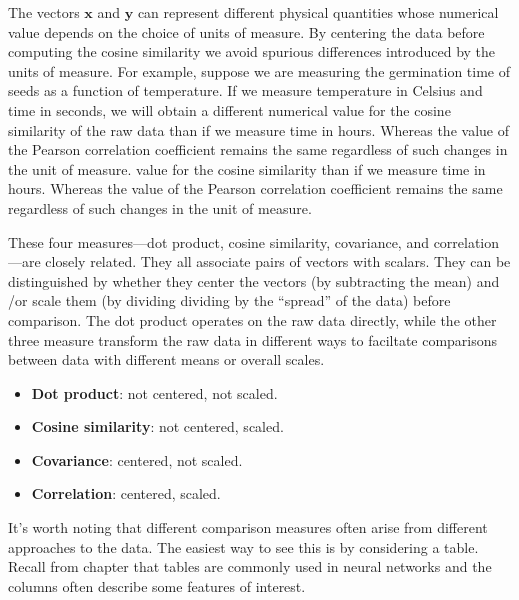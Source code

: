    The vectors $\mathbf{x}$ and $\mathbf{y}$ can represent different physical 
quantities whose numerical value depends on the choice of units of measure.
By centering the data before computing the cosine similarity we avoid spurious 
differences introduced by the units of measure.  For example, suppose we are 
measuring the germination time of seeds as a function of temperature.  If we 
measure temperature in Celsius and time in seconds, we will obtain a different 
numerical value for the cosine similarity of the raw data than if we measure 
time in hours.  Whereas the value of the Pearson correlation coefficient 
remains the same regardless of such changes in the unit of measure. 
value for the cosine similarity than if we measure time in hours.  Whereas the 
value of the Pearson correlation coefficient remains the same regardless of 
such changes in the unit of measure. 

   These four measures—dot product, cosine similarity, covariance, and 
correlation—are closely related.  They all associate pairs of vectors with 
scalars.  They can be distinguished by whether they center the vectors (by 
subtracting the mean) and /or scale them (by dividing dividing by the 
``spread'' of the data) before comparison.  The dot product operates on the raw
data directly, while the other three measure transform the raw data in 
different ways to faciltate comparisons between data with different means or 
overall scales.

\begin{itemize}
    \item \textbf{Dot product}: not centered, not scaled.
    \item \textbf{Cosine similarity}: not centered, scaled.
    \item \textbf{Covariance}: centered, not scaled.
    \item \textbf{Correlation}: centered, scaled.
\end{itemize}

   It's worth noting that different comparison measures often arise from 
different  approaches to the data.  The easiest way to see this is by 
considering a table.  Recall from chapter  that tables 
are commonly used in neural networks and the columns often describe some
features of interest.   

